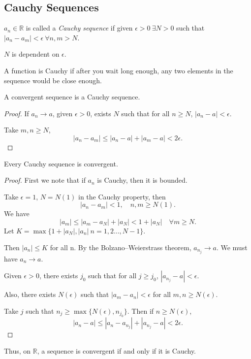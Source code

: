 \subsection{Cauchy Sequences}
\leavevmode
\begin{definition}
    \(a_n \in \mathbb{R}\) is called a \textit{Cauchy sequence} if given \(\epsilon > 0~\exists N > 0\) such that \(\left\vert a_n - a_m \right\vert <\epsilon ~\forall n,m > N\).
\end{definition}
\begin{note}
    \(N\) is dependent on \(\epsilon\).
\end{note}
A function is Cauchy if after you wait long enough, any two elements in the sequence would be close enough.
\begin{lemma}
    A convergent sequence is a Cauchy sequence.
\end{lemma}
\begin{proof}
    If \(a_n \to a\), given \(\epsilon > 0\), exists \(N\) such that for all \(n \geq  N\), \(\left\vert a_n - a \right\vert < \epsilon\).

    Take \(m, n \geq N\),
    \[
        \left\vert a_n - a_m \right\vert \leq \left\vert a_n - a \right\vert + \left\vert a_m - a \right\vert < 2\epsilon.
    \]
\end{proof}
\begin{lemma}
    Every Cauchy sequence is convergent.
\end{lemma}
\begin{proof}
    First we note that if \(a_n\) is Cauchy, then it is bounded.

    Take \(\epsilon = 1\), \(N = N(1)\) in the Cauchy property, then
    \[
        \left\vert a_n - a_m \right\vert < 1, \quad n, m \geq N(1).
    \]
    We have
    \[
        \left\vert a_m \right\vert \leq \left\vert a_m - a_N \right\vert + \left\vert a_N \right\vert < 1 + \left\vert a_N \right\vert \quad \forall m \geq N.
    \]
    Let \(K = \mathop{\max}\{1 + \left\vert a_N \right\vert, \left\vert a_n \right\vert~n=1,2 \ldots ,N-1\}\).

    Then \(\left\vert a_n \right\vert \leq K\) for all n. By the Bolzano–Weierstrass theorem, \(a_{n_j} \to a\). We must have \(a_n \to a\).

    Given \(\epsilon>0\), there exists \(j_0\) such that for all \(j \geq j_0\), \(\left\vert a_{n_j}-a \right\vert < \epsilon\).

    Also, there exists \(N(\epsilon)\) such that \(\left\vert a_m - a_n \right\vert < \epsilon\) for all \(m, n \geq N(\epsilon)\).

    Take \(j\) such that \(n_j\geq \max \{N(\epsilon),n_{j_0}\}\). Then if \(n \geq N(\epsilon)\),
    \[
        \left\vert a_n - a \right\vert \leq \left\vert a_n - a_{n_j} \right\vert + \left\vert a_{n_j} - a \right\vert < 2\epsilon.
    \]
\end{proof}
Thus, on \(\mathbb{R}\), a sequence is convergent if and only if it is Cauchy.

